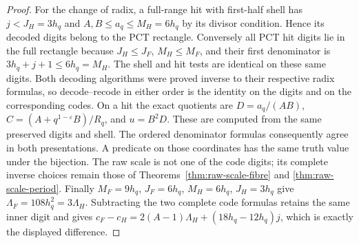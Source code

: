 \begin{proof}
For the change of radix, a full-range hit with first-half shell has
\(j<J_H=3h_q\) and \(A,B\le a_q\le M_H=6h_q\)
by its divisor condition.  Hence its decoded digits belong to the
PCT rectangle.  Conversely all PCT hit digits lie in the full
rectangle because \(J_H\le J_F\), \(M_H\le M_F\), and their
first denominator is \(3h_q+j+1\le6h_q=M_H\).
The shell and hit tests are identical on these same digits.
Both decoding algorithms were proved inverse to their respective
radix formulas, so decode--recode in either order is the identity
on the digits and on the corresponding codes.  On a hit the exact
quotients are \(D=a_q/(AB)\),
\(C=(A+q^{1-\varepsilon}B)/R_q\), and \(u=B^2D\).
These are computed from the same preserved digits and shell.
The ordered denominator formulas consequently agree in both
presentations.  A predicate on those coordinates has the same truth
value under the bijection.  The raw scale is not one of the code
digits; its complete inverse choices remain those of
Theorems~\ref{thm:raw-scale-fibre} and \ref{thm:raw-scale-period}.
Finally \(M_F=9h_q\), \(J_F=6h_q\), \(M_H=6h_q\),
\(J_H=3h_q\) give \(\Lambda_F=108h_q^2=3\Lambda_H\).
Subtracting the two complete code formulas retains the same inner
digit and gives
\(c_F-c_H=2(A-1)\Lambda_H+(18h_q-12h_q)j\),
which is exactly the displayed difference.
\end{proof}

